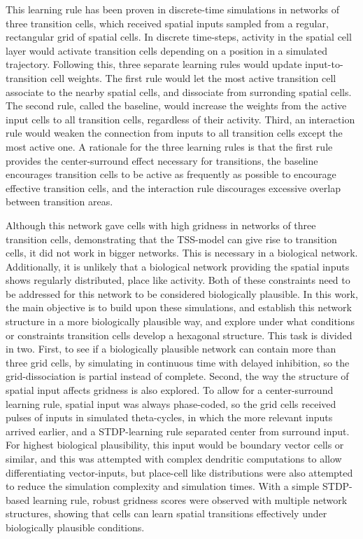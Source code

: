 \documentclass{article}
\begin{document}
    This learning rule has been proven in discrete-time simulations in networks of three transition cells, which received spatial inputs sampled from a regular, rectangular grid of spatial cells. In discrete time-steps, activity in the spatial cell layer would activate transition cells depending on a position in a simulated trajectory. Following this, three separate learning rules would update input-to-transition cell weights. The first rule would let the most active transition cell associate to the nearby spatial cells, and dissociate from surronding spatial cells. The second rule, called the baseline, would increase the weights from the active input cells to all transition cells, regardless of their activity. Third, an interaction rule would weaken the connection from inputs to all transition cells except the most active one.
    A rationale for the three learning rules is that the first rule provides the center-surround effect necessary for transitions, the baseline encourages transition cells to be active as frequently as possible to encourage effective transition cells, and the interaction rule discourages excessive overlap between transition areas.
    
    Although this network gave cells with high gridness in networks of three transition cells, demonstrating that the TSS-model can give rise to transition cells, it did not work in bigger networks. This is necessary in a biological network. Additionally, it is unlikely that a biological network providing the spatial inputs shows regularly distributed, place like activity. Both of these constraints need to be addressed for this network to be considered biologically plausible.
    In this work, the main objective is to build upon these simulations, and establish this network structure in a more biologically plausible way, and explore under what conditions or constraints transition cells develop a hexagonal structure. 
    This task is divided in two. First, to see if a biologically plausible network can contain more than three grid cells, by simulating in continuous time with delayed inhibition, so the grid-dissociation is partial instead of complete.
    Second, the way the structure of spatial input affects gridness is also explored. To allow for a center-surround learning rule, spatial input was always phase-coded, so the grid cells received pulses of inputs in simulated theta-cycles, in which the more relevant inputs arrived earlier, and a STDP-learning rule separated center from surround input. For highest biological plausibility, this input would be boundary vector cells or similar, and this was attempted with complex dendritic computations to allow differentiating vector-inputs, but place-cell like distributions were also attempted to reduce the simulation complexity and simulation times. With a simple STDP- based learning rule, robust gridness scores were observed with multiple network structures, showing that cells can learn spatial transitions effectively under biologically plausible conditions.
        
\end{document}
